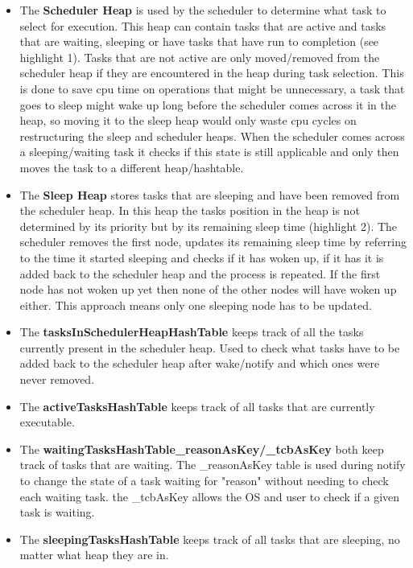 \documentclass[12pt,a4paper]{article}
\begin{document}
\begin{itemize}
  \item The \textbf{Scheduler Heap} is used by the scheduler to determine what task to select for execution. This heap can contain tasks that are active and tasks that are waiting, sleeping or have tasks that have run to completion (see highlight 1). Tasks that are not active are only moved/removed from the scheduler heap if they are encountered in the heap during task selection. This is done to save cpu time on operations that might be unnecessary, a task that goes to sleep might wake up long before the scheduler comes across it in the heap, so moving it to the sleep heap would only waste cpu cycles on restructuring the sleep and scheduler heaps. When the scheduler comes across a sleeping/waiting task it checks if this state is still applicable and only then moves the task to a different heap/hashtable.
  \item The \textbf{Sleep Heap} stores tasks that are sleeping and have been removed from the scheduler heap. In this heap the tasks position in the heap is not determined by its priority but by its remaining sleep time (highlight 2). The scheduler removes the first node, updates its remaining sleep time by referring to the time it started sleeping and checks if it has woken up, if it has it is added back to the scheduler heap and the process is repeated. If the first node has not woken up yet then none of the other nodes will have woken up either. This approach means only one sleeping node has to be updated.
  \item The \textbf{tasksInSchedulerHeapHashTable} keeps track of all the tasks currently present in the scheduler heap. Used to check what tasks have to be added back to the scheduler heap after wake/notify and which ones were never removed.
  \item The \textbf{activeTasksHashTable} keeps track of all tasks that are currently executable.
  \item The \textbf{waitingTasksHashTable\_reasonAsKey/\_tcbAsKey} both keep track of tasks that are waiting. The \_reasonAsKey table is used during notify to change the state of a task waiting for "reason" without needing to check each waiting task. the \_tcbAsKey allows the OS and user to check if a given task is waiting.
  \item The  \textbf{sleepingTasksHashTable} keeps track of all tasks that are sleeping, no matter what heap they are in.
\end{itemize}
\end{document}
